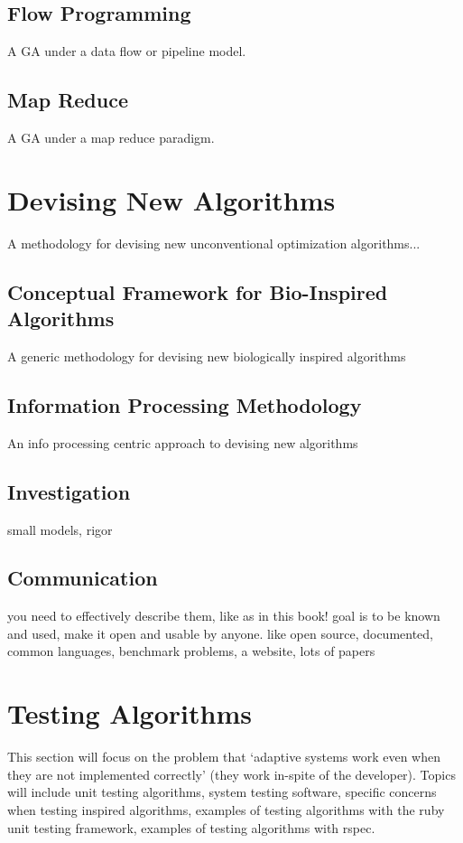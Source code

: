 \subsection{Flow Programming}
A GA under a data flow or pipeline model.

\subsection{Map Reduce}
A GA under a map reduce paradigm.


% 
% 
\section{Devising New Algorithms}
\label{advanced:sec:devising}
A methodology for devising new unconventional optimization algorithms...

\subsection{Conceptual Framework for Bio-Inspired Algorithms}
A generic methodology for devising new biologically inspired algorithms

\subsection{Information Processing Methodology}
An info processing centric approach to devising new algorithms

\subsection{Investigation}
small models, rigor

\subsection{Communication}
you need to effectively describe them, like as in this book!
goal is to be known and used, make it open and usable by anyone. like open source, documented, common languages, benchmark problems, a website, lots of papers


% 
% 
\section{Testing Algorithms}
\label{advanced:sec:testing}
This section will focus on the problem that `adaptive systems work even when they are not implemented correctly' (they work in-spite of the developer). Topics will include unit testing algorithms, system testing software, specific concerns when testing inspired algorithms, examples of testing algorithms with the ruby unit testing framework, examples of testing algorithms with rspec.

